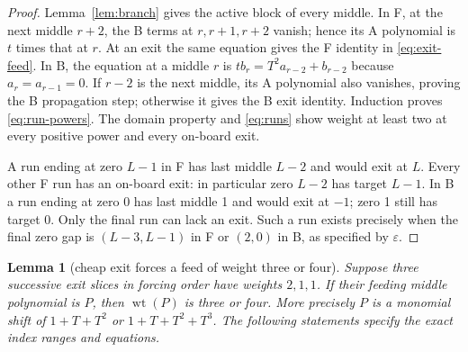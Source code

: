 \documentclass{article}
\newtheorem{lemma}{Lemma}
\DeclareMathOperator{\wt}{wt}
\begin{document}
\begin{proof}
  Lemma~\ref{lem:branch} gives the active block of every middle. In F, at the next middle
  \(r + 2\), the B terms at \(r, r + 1, r + 2\) vanish; hence its A polynomial is \(t\) times that
  at \(r\). At an exit the same equation gives the F identity in \eqref{eq:exit-feed}. In B, the
  equation at a middle \(r\) is \(t b_r = T^2 a_{r-2} + b_{r-2}\) because \(a_r = a_{r-1} = 0\). If
  \(r - 2\) is the next middle, its A polynomial also vanishes, proving the B propagation step;
  otherwise it gives the B exit identity. Induction proves \eqref{eq:run-powers}. The domain
  property and \eqref{eq:runs} show weight at least two at every positive power and every on-board
  exit.

  A run ending at zero \(L-1\) in F has last middle \(L-2\) and would exit at \(L\). Every other F run has an
  on-board exit: in particular zero \(L-2\) has target \(L-1\). In B a run ending at zero 0 has last middle 1
  and would exit at \(-1\); zero 1 still has target 0. Only the final run can lack an exit. Such a
  run exists precisely when the final zero gap is \((L-3,L-1)\) in F or \((2,0)\) in B, as specified
  by \(\varepsilon\).
\end{proof}

\begin{lemma}[cheap exit forces a feed of weight three or four]\label{lem:cheap-exit}
  Suppose three successive exit slices in forcing order have weights \(2, 1, 1\). If their feeding
  middle polynomial is \(P\), then \(\wt(P)\) is three or four. More precisely \(P\) is a monomial
  shift of \(1 + T + T^2\) or \(1 + T + T^2 + T^3\). The following statements specify the exact
  index ranges and equations.
\end{lemma}
\end{document}
